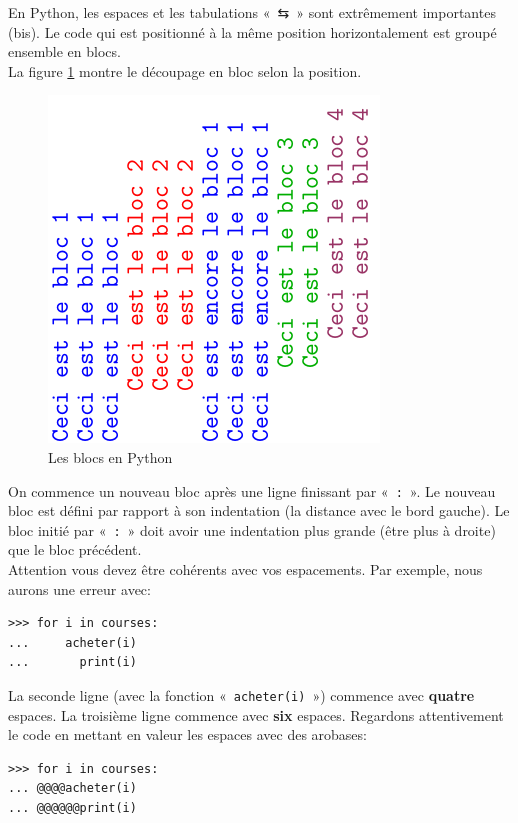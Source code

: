 En Python, les espaces et les tabulations «~\textsf{⇆}~» sont extrêmement  importantes (bis). Le code qui est positionné à la même position horizontalement est groupé ensemble en blocs.\\


La figure \ref{fig:blocs} montre le découpage en bloc selon la position.
\begin{figure}[H]
\centering
\includegraphics[scale=1,angle=270]{images/blocs.pdf}
\caption{Les blocs en Python}
\label{fig:blocs}
\end{figure}

On commence un nouveau bloc après une ligne finissant   par «~\verb+:+~». Le nouveau bloc est défini par rapport à son indentation (la distance avec le bord gauche). Le bloc initié par «~\verb+:+~» doit avoir une indentation plus grande (être plus à droite) que le bloc précédent.\\


Attention vous devez être cohérents avec vos espacements. Par exemple, nous aurons une erreur avec:

\begin{Verbatim}[frame=single,rulecolor=\color{red}, label=erreur]
>>> for i in courses:
...     acheter(i)
...       print(i)
\end{Verbatim}

La seconde ligne (avec la fonction «~\texttt{acheter(i)}~») commence avec \textbf{quatre} espaces. La troisième ligne commence avec \textbf{six} espaces. Regardons attentivement le code en mettant en valeur les espaces avec des arobases:

\begin{Verbatim}[frame=single,rulecolor=\color{gray}, label=ne pas saisir]
>>> for i in courses:
... @@@@acheter(i)
... @@@@@@print(i)
\end{Verbatim}

